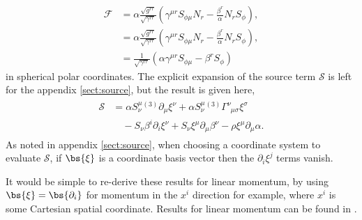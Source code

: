 \begin{align}
 \mathcal{F} &= \alpha\frac{\sqrt{g^{rr}}}{\sqrt{\gamma^{rr}}} (\gamma^{\mu r} S_{\phi\mu} N_r -\frac{\beta^r}{\alpha}N_r S_\phi), \\ 
 &= \alpha\frac{\sqrt{g^{rr}}}{\sqrt{\gamma^{rr}}} (\gamma^{\mu r} S_{\phi\mu} N_r -\frac{\beta^r}{\alpha}N_r S_\phi), \\ 
  \label{final_flux} &= \frac{1}{\sqrt{\gamma^{rr}}}\left(\alpha \gamma^{\mu r}S_{\phi\mu} -\beta^r S_\phi\right)
\end{align} 
in spherical polar coordinates. The explicit expansion of the source term $\mathcal{S}$ is left for the appendix \ref{sect:source}, but the result is given here,
\begin{align}\label{s_explicit_angmom} 
\begin{split}\mathcal{S} &= \alpha S^\mu_{\nu}{}^{(3)}\partial_\mu \xi^\nu + \alpha S^\mu_{\nu} {}^{(3)}\Gamma^\nu_{\,\,\,\mu \sigma} \xi^\sigma \\&\quad- S_\nu \beta^i \partial_i \xi^\nu  + S_\nu \xi^\mu \partial_\mu \beta^\nu - \rho \xi^\mu \partial_\mu \alpha.
\end{split}
\end{align}
As noted in appendix \ref{sect:source}, when choosing a coordinate system to evaluate $\mathcal{S}$, if $\bs{\xi}$ is a coordinate basis vector then the $\partial_i \xi^j$ terms vanish. 

It would be simple to re-derive these results for linear momentum, by using $\bs{\xi} = \bs{\partial_i}$ for momentum in the $x^i$ direction for example, where $x^i$ is some Cartesian spatial coordinate. Results for linear momentum can be found in \cite{clough2021continuity}.



